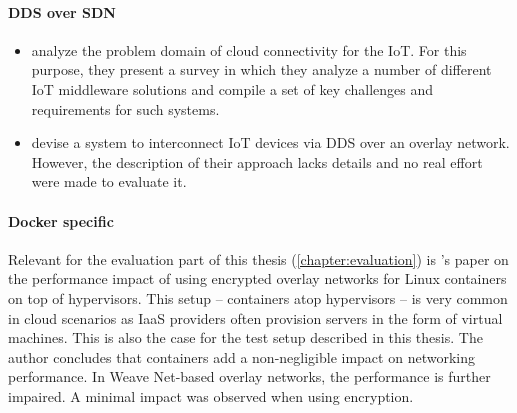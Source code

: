 %
%
%
%
%

\paragraph{DDS over SDN}
\begin{itemize}
	\item \citeauthor*{farahzadi2017middleware} \cite{farahzadi2017middleware} analyze the problem domain of cloud connectivity for the IoT. For this purpose, they present a survey in which they analyze a number of different IoT middleware solutions and compile a set of key challenges and requirements for such systems.
	\item \citeauthor*{hakiri2015publish} \cite{hakiri2015publish} devise a system to interconnect IoT devices via DDS over an overlay network. However, the description of their approach lacks details and no real effort were made to evaluate it.
\end{itemize}


\paragraph{Docker specific}
Relevant for the evaluation part of this thesis (\autoref{chapter:evaluation}) is \citeauthor*{kratzke2017microservices}'s paper \cite{kratzke2017microservices} on the performance impact of using encrypted overlay networks for Linux containers on top of hypervisors. This setup -- containers atop hypervisors -- is very common in cloud scenarios as IaaS providers often provision servers in the form of virtual machines. This is also the case for the test setup described in this thesis. The author concludes that containers add a non-negligible impact on networking performance. In Weave Net-based overlay networks, the performance is further impaired. A minimal impact was observed when using encryption.



